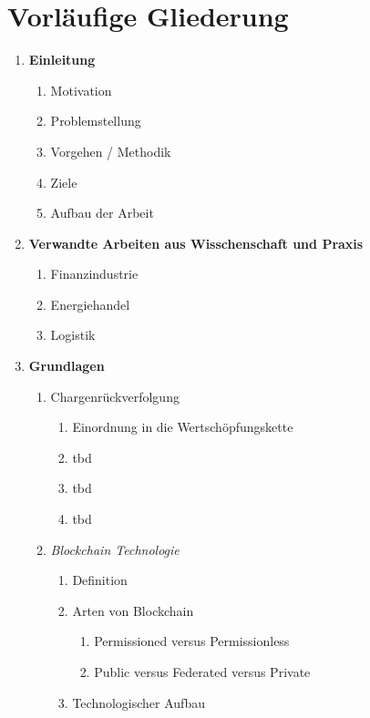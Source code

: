 \section{Vorläufige Gliederung}
\begin{small}
  \begin{enumerate}
    \item \textbf{Einleitung}
    \begin{enumerate}[label*=\arabic*.]
      \item Motivation
      \item Problemstellung
      \item Vorgehen / Methodik
      \item Ziele
      \item Aufbau der Arbeit
    \end{enumerate}
    \item \textbf{Verwandte Arbeiten aus Wisschenschaft und Praxis}
    \begin{enumerate}[label*=\arabic*.]
      \item Finanzindustrie
      \item Energiehandel
      \item Logistik
    \end{enumerate}
    \item \textbf{Grundlagen}
    \begin{enumerate}[label*=\arabic*.]
      \item Chargenrückverfolgung
      \begin{enumerate}[label*=\arabic*.]
        \item Einordnung in die Wertschöpfungskette
        \item tbd
        \item tbd
        \item tbd
      \end{enumerate}
      \item \textit{Blockchain Technologie}
      \begin{enumerate}[label*=\arabic*.]
        \item Definition
        \item Arten von Blockchain
        \begin{enumerate}[label*=\arabic*.]
          \item Permissioned versus Permissionless
          \item Public versus Federated versus Private
        \end{enumerate}
        \item Technologischer Aufbau

\end{enumerate}
\end{enumerate}
\end{enumerate}
\end{small}
